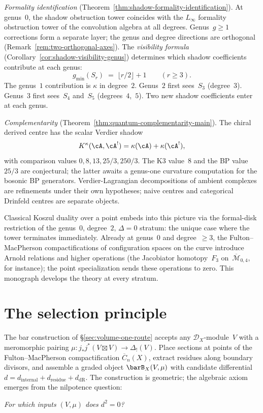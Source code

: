 \emph{Formality identification}
(Theorem~\ref{thm:shadow-formality-identification}).
At genus~$0$, the shadow obstruction tower coincides with the $L_\infty$
formality obstruction tower of the convolution algebra
at all degrees. Genus~$g \geq 1$ corrections form a separate layer; the genus and degree directions are orthogonal
(Remark~\ref{rem:two-orthogonal-axes}).
The \emph{visibility formula}
(Corollary~\ref{cor:shadow-visibility-genus})
determines which shadow coefficients contribute at each genus:
\begin{equation}\label{eq:intro-visibility}
g_{\min}(S_r) \;=\; \lfloor r/2 \rfloor + 1
\qquad (r \geq 3).
\end{equation}
The genus~$1$ contribution is $\kappa$ in degree~$2$.
Genus~$2$ first sees~$S_3$ (degree~$3$).
Genus~$3$ first sees~$S_4$ and~$S_5$ (degrees~$4$,~$5$).
Two new shadow coefficients enter at each genus.

\emph{Complementarity} (Theorem~\ref{thm:quantum-complementarity-main}).
The chiral derived centre has the scalar Verdier shadow
\[
K^\kappa(\cA,\cA^!)=\kappa(\cA)+\kappa(\cA^!),
\]
with comparison values
$0,8,13,25/3,250/3$.  The K3 value~$8$ and the BP value~$25/3$
are conjectural; the latter awaits a genus-one curvature computation
for the bosonic BP generators. Verdier-Lagrangian decompositions of ambient
complexes are refinements under their own hypotheses; naive centres
and categorical Drinfeld centres are separate objects.

Classical Koszul duality over a point embeds into this picture via the formal-disk restriction of the genus~$0$, degree~$2$, $\Delta = 0$ stratum: the unique case where the tower terminates immediately. Already at genus~$0$ and degree~$\geq 3$, the Fulton--MacPherson compactifications of configuration spaces on the curve introduce Arnold relations and higher operations (the Jacobiator homotopy~$F_3$ on~$\overline{\mathcal{M}}_{0,4}$, for instance); the point specialization sends these operations to zero. This monograph develops the theory at every stratum.

\section{The selection principle}
\label{sec:selection-principle}

The bar construction of \S\ref{sec:volume-one-route} accepts
any $\mathcal{D}_X$-module~$V$
with a meromorphic pairing
$\mu \colon j_* j^*(V \boxtimes V) \to \Delta_!(V)$.
Place sections at points of the Fulton--MacPherson compactification
$\overline{C}_n(X)$, extract residues along
boundary divisors, and assemble a graded object
$\barB_X(V, \mu)$ with candidate differential
$d = d_{\mathrm{internal}} + d_{\mathrm{residue}}
+ d_{\mathrm{dR}}$.
The construction is geometric; the algebraic axiom emerges from the
nilpotence question:
\begin{center}
\emph{For which inputs $(V, \mu)$ does
$d^2 = 0$?}
\end{center}

